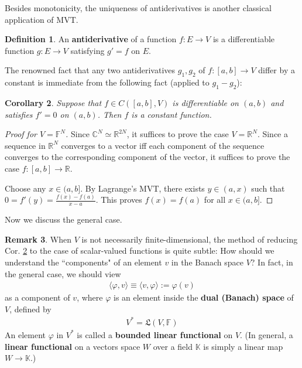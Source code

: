 \documentclass[12pt,b5paper,notitlepage]{article}
\theoremstyle{definition}
\newtheorem{df}{Definition}[section]
\newtheorem{rem}[df]{Remark}
\theoremstyle{plain}
\newtheorem{co}[df]{Corollary}
\newcommand{\fk}{\mathfrak}
\newcommand{\bk}[1]{\langle {#1}\rangle}
\newcommand{\Kbb}{\mathbb K}
\newcommand{\Cbb}{\mathbb C}
\newcommand{\Rbb}{\mathbb R}
\newcommand{\Fbb}{\mathbb F}
\newcommand{\dps}{\displaystyle}
\numberwithin{equation}{section}
\begin{document}
Besides monotonicity, the uniqueness of antiderivatives is another classical application of MVT.

\begin{df}
An \textbf{antiderivative}  of a function $f:E\rightarrow V$ is a differentiable function $g:E\rightarrow V$ satisfying $g'=f$ on $E$.
\end{df}

The renowned fact that any two antiderivatives $g_1,g_2$ of $f:[a,b]\rightarrow V$ differ by a constant is immediate from the following fact (applied to $g_1-g_2$):

\begin{co}\label{lb326}
Suppose that $f\in C([a,b],V)$ is differentiable on $(a,b)$ and satisfies $f'=0$ on $(a,b)$. Then $f$ is a constant function.
\end{co}

\begin{proof}[Proof for $V=\Fbb^N$]
Since $\Cbb^N\simeq\Rbb^{2N}$, it suffices to prove the case $V=\Rbb^N$. Since a sequence in $\Rbb^N$ converges to a vector iff each component of the sequence converges to the corresponding component of the vector, it suffices to prove the case $f:[a,b]\rightarrow\Rbb$.  

Choose any $x\in(a,b]$. By Lagrange's MVT, there exists $y\in(a,x)$ such that $\dps 0=f'(y)=\frac{f(x)-f(a)}{x-a}$. This proves $f(x)=f(a)$ for all $x\in(a,b]$.
\end{proof}


Now we discuss the general case. 

\begin{rem}\label{lb560}
When $V$ is not necessarily finite-dimensional, the method of reducing Cor. \ref{lb326} to the case of scalar-valued functions is quite subtle: How should we understand the ``components" of an element $v$ in the Banach space $V$? In fact, in the general case, we should view
\begin{align*}
\bk{\varphi,v}\equiv\bk{v,\varphi}:=\varphi(v)
\end{align*}
as a component of $v$, where $\varphi$ is an element inside the \textbf{dual (Banach) space}  of $V$, defined by 
\begin{align}
V^*=\fk L(V,\Fbb)
\end{align}
An element $\varphi$ in $V^*$ is called a \textbf{bounded linear functional} on $V$.  (In general, a \textbf{linear functional}  on a vectors space $W$ over a field $\Kbb$ is simply a linear map $W\rightarrow\Kbb$.)
\end{rem}
\end{document}
